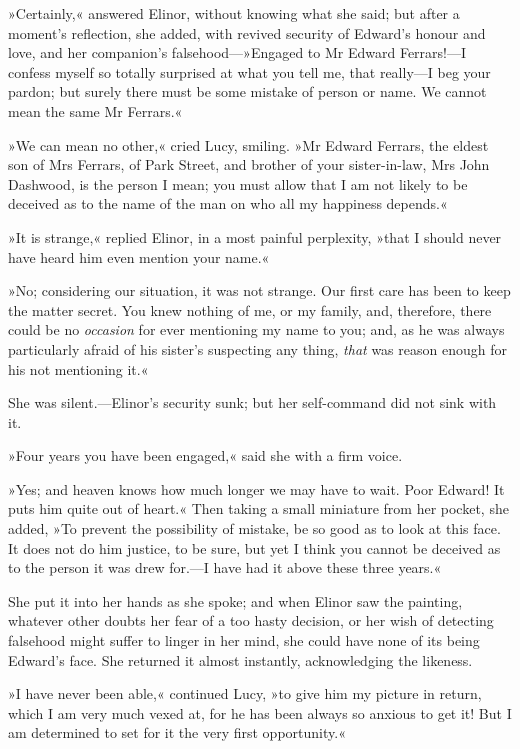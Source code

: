»Certainly,« answered Elinor, without knowing what she said; but after a moment’s reflection, she added, with revived security of Edward’s honour and love, and her companion’s falsehood—»Engaged to Mr Edward Ferrars!—I confess myself so totally surprised at what you tell me, that really—I beg your pardon; but surely there must be some mistake of person or name. We cannot mean the same Mr Ferrars.«

»We can mean no other,« cried Lucy, smiling. »Mr Edward Ferrars, the eldest son of Mrs Ferrars, of Park Street, and brother of your sister-in-law, Mrs John Dashwood, is the person I mean; you must allow that I am not likely to be deceived as to the name of the man on who all my happiness depends.«

»It is strange,« replied Elinor, in a most painful perplexity, »that I should never have heard him even mention your name.«

»No; considering our situation, it was not strange. Our first care has been to keep the matter secret. You knew nothing of me, or my family, and, therefore, there could be no \textit{occasion} for ever mentioning my name to you; and, as he was always particularly afraid of his sister’s suspecting any thing, \textit{that} was reason enough for his not mentioning it.«

She was silent.—Elinor’s security sunk; but her self-command did not sink with it.

»Four years you have been engaged,« said she with a firm voice.

»Yes; and heaven knows how much longer we may have to wait. Poor Edward! It puts him quite out of heart.« Then taking a small miniature from her pocket, she added, »To prevent the possibility of mistake, be so good as to look at this face. It does not do him justice, to be sure, but yet I think you cannot be deceived as to the person it was drew for.—I have had it above these three years.«

She put it into her hands as she spoke; and when Elinor saw the painting, whatever other doubts her fear of a too hasty decision, or her wish of detecting falsehood might suffer to linger in her mind, she could have none of its being Edward’s face. She returned it almost instantly, acknowledging the likeness.

»I have never been able,« continued Lucy, »to give him my picture in return, which I am very much vexed at, for he has been always so anxious to get it! But I am determined to set for it the very first opportunity.«

